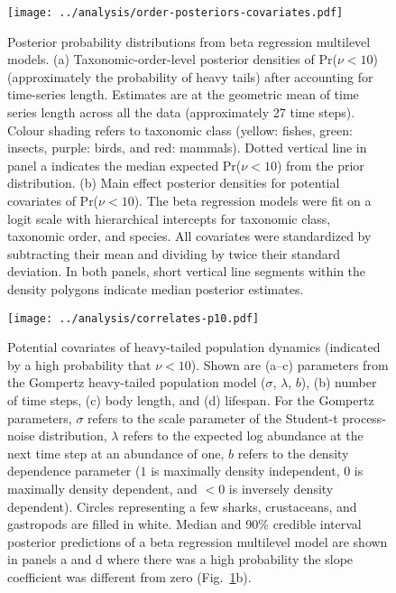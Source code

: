 \begin{figure}[htbp]
\begin{center}
\texttt{[image: ../analysis/order-posteriors-covariates.pdf]}

\caption[Posterior probability distributions from beta regression multilevel
  models.]{Posterior probability distributions from beta regression multilevel
  models. (a) Taxonomic-order-level posterior densities of Pr($\nu < 10$)
  (approximately the probability of heavy tails) after accounting for
  time-series length. Estimates are at the geometric mean of time series
  length across all the data (approximately 27 time steps). Colour shading
  refers to taxonomic class (yellow: fishes, green: insects, purple: birds,
  and red: mammals). Dotted vertical line in panel a indicates the median
  expected Pr($\nu < 10$) from the prior distribution. (b) Main effect
  posterior densities for potential covariates of Pr($\nu < 10$). The beta
  regression models were fit on a logit scale with hierarchical intercepts for
  taxonomic class, taxonomic order, and species. All covariates were
  standardized by subtracting their mean and dividing by twice their standard
  deviation. In both panels, short vertical line segments within the density
  polygons indicate median posterior estimates.}

\label{fig:posteriors}
\end{center}
\end{figure}

\begin{figure}[htbp]
\begin{center}
\texttt{[image: ../analysis/correlates-p10.pdf]}

\caption[Potential covariates of heavy-tailed population dynamics (indicated
  by a high probability that $\nu < 10$).]{Potential covariates of heavy-tailed population dynamics (indicated
  by a high probability that $\nu < 10$). Shown are (a--c) parameters from the
  Gompertz heavy-tailed population model ($\sigma$, $\lambda$, $b$), (b)
  number of time steps, (c) body length, and (d) lifespan. For the Gompertz
  parameters, $\sigma$ refers to the scale parameter of the Student-t
  process-noise distribution, $\lambda$ refers to the expected log abundance
  at the next time step at an abundance of one, $b$ refers to the density
  dependence parameter ($1$ is maximally density independent, $0$ is maximally
  density dependent, and $<0$ is inversely density dependent). Circles
  representing a few sharks, crustaceans, and gastropods are filled in white.
  Median and 90\% credible interval posterior predictions of a beta regression
  multilevel model are shown in panels a and d where there was a high
  probability the slope coefficient was different from zero
  (Fig.~\ref{fig:posteriors}b).}

\label{fig:correlates}
\end{center}
\end{figure}

